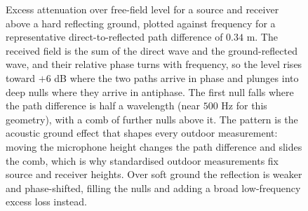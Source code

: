 \begin{figure}[htbp]
\centering
{}
\caption[Ground-reflection interference and excess attenuation]{Excess
attenuation over free-field level for a source and receiver above a hard
reflecting ground, plotted against frequency for a representative
direct-to-reflected path difference of $0.34$ m. The received field is
the sum of the direct wave and the ground-reflected wave, and their
relative phase turns with frequency, so the level rises toward $+6$ dB
where the two paths arrive in phase and plunges into deep nulls where
they arrive in antiphase. The first null falls where the path difference
is half a wavelength (near $500$ Hz for this geometry), with a comb of
further nulls above it. The pattern is the acoustic ground effect that
shapes every outdoor measurement: moving the microphone height changes
the path difference and slides the comb, which is why standardised
outdoor measurements fix source and receiver heights. Over soft ground
the reflection is weaker and phase-shifted, filling the nulls and adding
a broad low-frequency excess loss instead.}
\label{fig:vol03ch07:ground-interference}
\end{figure}
